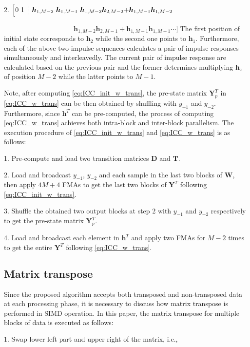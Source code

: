 2. $\Big[0 ~ 1~ \dashline ~\bm{h}_{1,M-2} ~\bm{h}_{1,M-1} ~\bm{h}_{1,M-2}\bm{h}_{2,M-2}{+}\bm{h}_{1,M-1}\bm{h}_{1,M-2} $

$\quad\quad\quad\quad\quad\quad\quad\quad\quad\quad ~ \bm{h}_{1,M-2}\bm{h}_{2,M-1}{+}\bm{h}_{1,M-1}\bm{h}_{1,M-1} \cdots\Big]$
The first position of initial state corresponds to $\bm{h}_2$ while the second one points to $\bm{h}_1$. Furthermore,
each of the above two impulse sequences calculates a pair of impulse responses simultaneously and interleavedly.
The current pair of impulse response are calculated based on the previous pair and the former determines multiplying $\bm{h}_x$ of position $M{-}2$  
while the latter points to $M{-}1$. 

Note, after computing \eqref{eq:ICC_init_w_trans}, the pre-state matrix $\bm{Y}_p^T$ in \eqref{eq:ICC_w_trans}
can be then obtained by shuffling with $y_{-1}$ and $y_{-2}$. Furthermore,
since $\bm{h}^T$ can be pre-computed,
the process of computing \eqref{eq:ICC_w_trans} achieves both intra-block and inter-block parallelism.
The execution procedure of \eqref{eq:ICC_init_w_trans} and \eqref{eq:ICC_w_trans} is as follows:

1. Pre-compute and load two transition matrices $\bm{D}$ and $\bm{T}$.

2. Load and broadcast $y_{-1}$, $y_{-2}$ and each sample in the last two blocks of $\bm{W}$, then apply
$4M{+}4$ FMAs to get the last two blocks of $\bm{Y}^T$ following \eqref{eq:ICC_init_w_trans}.

3. Shuffle the obtained two output blocks at step 2 with $y_{-1}$ and $y_{-2}$ respectively to get the pre-state matrix $\bm{Y}_p^T$.

4. Load and broadcast each element in $\bm{h}^T$ and apply two FMAs for $M{-}2$ times to get the entire $\bm{Y}^T$ following \eqref{eq:ICC_w_trans}.

\subsection{Matrix transpose}


Since the proposed algorithm accepts both transposed and non-transposed data at each processing phase, it is necessary to discuss
how matrix transpose is performed in SIMD operation. In this paper, the matrix transpose for multiple blocks of data is executed as follows:

1. Swap lower left part and upper right of the matrix, i.e.,

